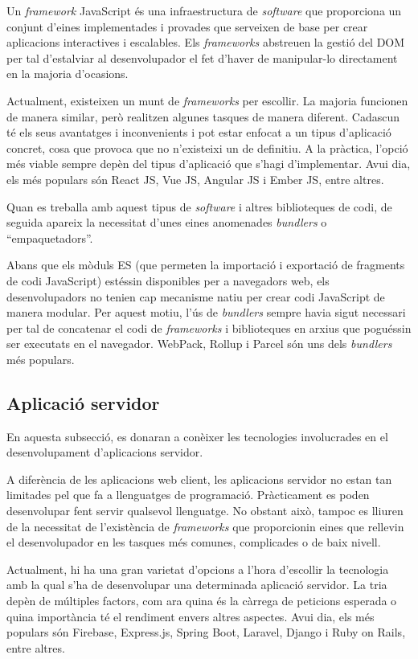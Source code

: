 \documentclass[a4paper,12pt]{ThesisStyle}
\begin{document}
Un \textit{framework} JavaScript és una infraestructura de \textit{software} que proporciona un conjunt d'eines implementades i provades que serveixen de base per crear aplicacions interactives i escalables. Els \textit{frameworks} abstreuen la gestió del DOM per tal d'estalviar al desenvolupador el fet d'haver de manipular-lo directament en la majoria d'ocasions.

Actualment, existeixen un munt de \textit{frameworks} per escollir. La majoria funcionen de manera similar, però realitzen algunes tasques de manera diferent. Cadascun té els seus avantatges i inconvenients i pot estar enfocat a un tipus d'aplicació concret, cosa que provoca que no n'existeixi un de definitiu. A la pràctica, l'opció més viable sempre depèn del tipus d'aplicació que s'hagi d'implementar. Avui dia, els més populars són React JS, Vue JS, Angular JS i Ember JS, entre altres.

Quan es treballa amb aquest tipus de \textit{software} i altres biblioteques de codi, de seguida apareix la necessitat d'unes eines anomenades \textit{bundlers} o ``empaquetadors''.

Abans que els mòduls ES (que permeten la importació i exportació de fragments de codi JavaScript) estéssin disponibles per a navegadors web, els desenvolupadors no tenien cap mecanisme natiu per crear codi JavaScript de manera modular. Per aquest motiu, l'ús de \textit{bundlers} sempre havia sigut necessari per tal de concatenar el codi de \textit{frameworks} i biblioteques en arxius que poguéssin ser executats en el navegador. WebPack, Rollup i Parcel són uns dels \textit{bundlers} més populars.

\subsection{Aplicació servidor}
\label{subsec:aplicacio_servidor}

En aquesta subsecció, es donaran a conèixer les tecnologies involucrades en el desenvolupament d'aplicacions servidor.

A diferència de les aplicacions web client, les aplicacions servidor no estan tan limitades pel que fa a llenguatges de programació. Pràcticament es poden desenvolupar fent servir qualsevol llenguatge. No obstant això, tampoc es lliuren de la necessitat de l'existència de \textit{frameworks} que proporcionin eines que rellevin el desenvolupador en les tasques més comunes, complicades o de baix nivell.

Actualment, hi ha una gran varietat d'opcions a l'hora d'escollir la tecnologia amb la qual s'ha de desenvolupar una determinada aplicació servidor. La tria depèn de múltiples factors, com ara quina és la càrrega de peticions esperada o quina importància té el rendiment envers altres aspectes. Avui dia, els més populars són Firebase, Express.js, Spring Boot, Laravel, Django i Ruby on Rails, entre altres.
\end{document}
